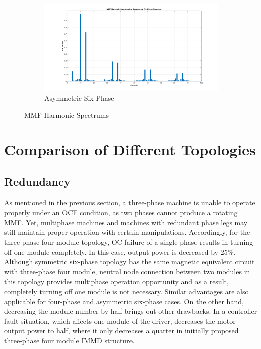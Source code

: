 \documentclass[a4paper,11pt]{article}
\begin{document}
\begin{figure}[ht!]
\begin{subfigure}[b]{0.33\textwidth}
    \centering
    \includegraphics[width=\linewidth]{mmf_harm_asym.png}
    \caption{Asymmetric Six-Phase}
    \label{fig:as6phmmf}    
\end{subfigure}
 \caption{MMF Harmonic Spectrums}
 \label{fig:harmonics}
\end{figure}


\section{\normalsize\textbf{Comparison of Different Topologies}}
\subsection{\normalsize\textbf{Redundancy}}
As mentioned in the previous section, a three-phase machine is unable to operate properly under an OCF condition, as two phases cannot produce a rotating MMF. Yet, multiphase machines and machines with redundant phase legs may still maintain proper operation with certain manipulations. Accordingly, for the three-phase four module topology, OC failure of a single phase results in turning off one module completely. In this case, output power is decreased by 25\%. Although symmetric six-phase topology has the same magnetic equivalent circuit with three-phase four module, neutral node connection between two modules in this topology provides multiphase operation opportunity and as a result, completely turning off one module is not necessary. Similar advantages are also applicable for four-phase and asymmetric six-phase cases. On the other hand, decreasing the module number by half brings out other drawbacks. In a controller fault situation, which affects one module of the driver, decreases the motor output power to half, where it only decreases a quarter in initially proposed three-phase four module IMMD structure.
\end{document}
